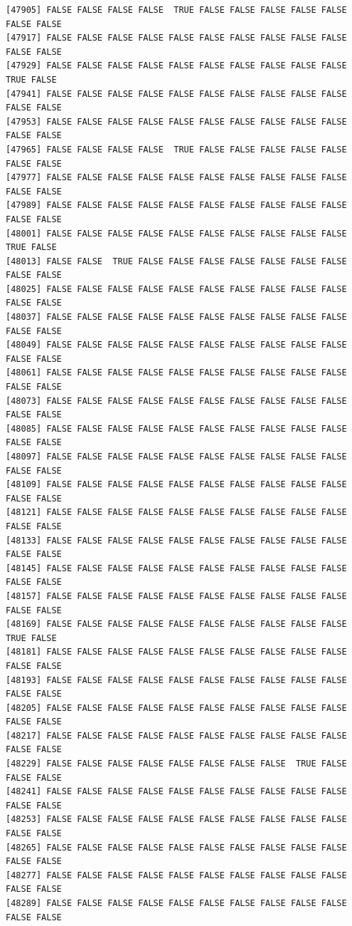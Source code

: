 \documentclass[
  a4paper,
  DIV=11,
  numbers=noendperiod]{scrartcl}
\begin{document}
\begin{verbatim}
[47905] FALSE FALSE FALSE FALSE  TRUE FALSE FALSE FALSE FALSE FALSE FALSE FALSE
[47917] FALSE FALSE FALSE FALSE FALSE FALSE FALSE FALSE FALSE FALSE FALSE FALSE
[47929] FALSE FALSE FALSE FALSE FALSE FALSE FALSE FALSE FALSE FALSE  TRUE FALSE
[47941] FALSE FALSE FALSE FALSE FALSE FALSE FALSE FALSE FALSE FALSE FALSE FALSE
[47953] FALSE FALSE FALSE FALSE FALSE FALSE FALSE FALSE FALSE FALSE FALSE FALSE
[47965] FALSE FALSE FALSE FALSE  TRUE FALSE FALSE FALSE FALSE FALSE FALSE FALSE
[47977] FALSE FALSE FALSE FALSE FALSE FALSE FALSE FALSE FALSE FALSE FALSE FALSE
[47989] FALSE FALSE FALSE FALSE FALSE FALSE FALSE FALSE FALSE FALSE FALSE FALSE
[48001] FALSE FALSE FALSE FALSE FALSE FALSE FALSE FALSE FALSE FALSE  TRUE FALSE
[48013] FALSE FALSE  TRUE FALSE FALSE FALSE FALSE FALSE FALSE FALSE FALSE FALSE
[48025] FALSE FALSE FALSE FALSE FALSE FALSE FALSE FALSE FALSE FALSE FALSE FALSE
[48037] FALSE FALSE FALSE FALSE FALSE FALSE FALSE FALSE FALSE FALSE FALSE FALSE
[48049] FALSE FALSE FALSE FALSE FALSE FALSE FALSE FALSE FALSE FALSE FALSE FALSE
[48061] FALSE FALSE FALSE FALSE FALSE FALSE FALSE FALSE FALSE FALSE FALSE FALSE
[48073] FALSE FALSE FALSE FALSE FALSE FALSE FALSE FALSE FALSE FALSE FALSE FALSE
[48085] FALSE FALSE FALSE FALSE FALSE FALSE FALSE FALSE FALSE FALSE FALSE FALSE
[48097] FALSE FALSE FALSE FALSE FALSE FALSE FALSE FALSE FALSE FALSE FALSE FALSE
[48109] FALSE FALSE FALSE FALSE FALSE FALSE FALSE FALSE FALSE FALSE FALSE FALSE
[48121] FALSE FALSE FALSE FALSE FALSE FALSE FALSE FALSE FALSE FALSE FALSE FALSE
[48133] FALSE FALSE FALSE FALSE FALSE FALSE FALSE FALSE FALSE FALSE FALSE FALSE
[48145] FALSE FALSE FALSE FALSE FALSE FALSE FALSE FALSE FALSE FALSE FALSE FALSE
[48157] FALSE FALSE FALSE FALSE FALSE FALSE FALSE FALSE FALSE FALSE FALSE FALSE
[48169] FALSE FALSE FALSE FALSE FALSE FALSE FALSE FALSE FALSE FALSE  TRUE FALSE
[48181] FALSE FALSE FALSE FALSE FALSE FALSE FALSE FALSE FALSE FALSE FALSE FALSE
[48193] FALSE FALSE FALSE FALSE FALSE FALSE FALSE FALSE FALSE FALSE FALSE FALSE
[48205] FALSE FALSE FALSE FALSE FALSE FALSE FALSE FALSE FALSE FALSE FALSE FALSE
[48217] FALSE FALSE FALSE FALSE FALSE FALSE FALSE FALSE FALSE FALSE FALSE FALSE
[48229] FALSE FALSE FALSE FALSE FALSE FALSE FALSE FALSE  TRUE FALSE FALSE FALSE
[48241] FALSE FALSE FALSE FALSE FALSE FALSE FALSE FALSE FALSE FALSE FALSE FALSE
[48253] FALSE FALSE FALSE FALSE FALSE FALSE FALSE FALSE FALSE FALSE FALSE FALSE
[48265] FALSE FALSE FALSE FALSE FALSE FALSE FALSE FALSE FALSE FALSE FALSE FALSE
[48277] FALSE FALSE FALSE FALSE FALSE FALSE FALSE FALSE FALSE FALSE FALSE FALSE
[48289] FALSE FALSE FALSE FALSE FALSE FALSE FALSE FALSE FALSE FALSE FALSE FALSE

\end{verbatim}
\end{document}
